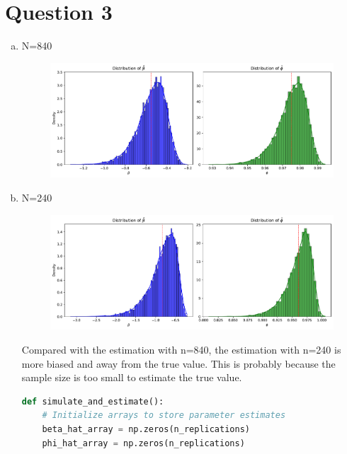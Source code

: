 
\section*{Question 3}

\begin{enumerate}[(a)]
    \item
    N=840\\
    \begin{figure}[h]
        \centering
        \includegraphics[width=0.9\linewidth]{Out/EX3-1.pdf}
        
    \end{figure}

  \item
    N=240\\
    \begin{figure}[h]
        \centering
        \includegraphics[width=0.9\linewidth]{Out/EX3-2.pdf}
        
    \end{figure}
Compared with the estimation with n=840, the estimation with n=240 is more biased and away from the true value.
This is probably because the sample size is too small to estimate the true value.


\begin{lstlisting}[language=Python, caption=Python code for simulation, label={lst:q1a}, escapechar=|, frame=single, basicstyle=\small, showstringspaces=false, captionpos=b, breaklines=true, showspaces=false, showtabs=false, keywordstyle=\color{blue}, commentstyle=\color{gray}]
    def simulate_and_estimate():
    # Initialize arrays to store parameter estimates
    beta_hat_array = np.zeros(n_replications)
    phi_hat_array = np.zeros(n_replications)


\end{lstlisting}
\end{enumerate}
